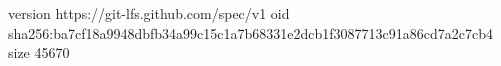 version https://git-lfs.github.com/spec/v1
oid sha256:ba7cf18a9948dbfb34a99c15c1a7b68331e2dcb1f3087713c91a86cd7a2c7cb4
size 45670

